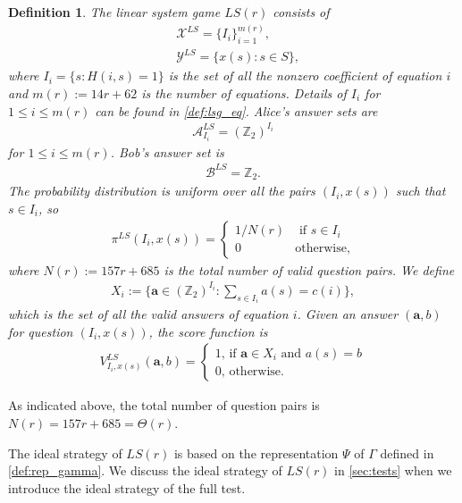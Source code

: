\documentclass[11pt,letterpaper]{article}
\newcommand{\Z}{\mathbb{Z}}
\newcommand{\calX}{\mathcal{X}}
\newcommand{\calY}{\mathcal{Y}}
\newcommand{\calA}{\mathcal{A}}
\newcommand{\calB}{\mathcal{B}}
\newcommand{\1}{\mathbb{1}}
\newcommand{\LS}{LS}
\newcommand{\mr}{m(r)}
\newcommand{\ba}{\pmb{a}}
\newtheorem{definition}[theorem]{Definition}
\theoremstyle{definition}
\begin{document}
\begin{definition}
\label{def:lsg}
The linear system game $\LS(r)$ consists of
\begin{align*}
    & \calX^{\LS} = \{I_i\}_{i=1}^{\mr}, \\
    & \calY^{\LS} = \{ x(s) : s \in S \},
\end{align*}
where $I_i = \{ s : H(i,s) = 1\}$ is the set of all the nonzero coefficient of equation $i$
and $\mr := 14r + 62$ is the number of equations.  
Details of $I_i$ for $1 \leq i \leq \mr$ can be found in \cref{def:lsg_eq}.
Alice's answer sets are 
\begin{align*}
    \calA^{\LS}_{I_i} = (\Z_2)^{I_i}
\end{align*}
for $1 \leq i \leq \mr$.
Bob's answer set is
\begin{align*}
    \calB^{\LS} = \Z_2.
\end{align*}
The probability distribution is uniform over all the pairs $(I_i, x(s))$ such that $s \in I_i$, so
\begin{align*}
    \pi^{\LS}(I_i, x(s)) = 
    \begin{cases}
        1/N(r) & \text{ if } s \in I_i \\
        0 & \text{otherwise,}
    \end{cases}
\end{align*}
where $N(r) := 157r + 685$ is the total number of valid question pairs.
We define 
\begin{align*}
    X_i := \{ \ba \in (\Z_2)^{I_i}: \sum_{s \in I_i} a(s) = c(i) \},
\end{align*}
which is the set of all the valid answers of equation $i$.
Given an answer $(\ba,b)$ for question $(I_i,x(s))$, 
the score function is
\begin{align*}
    V^{\LS}_{I_i, x(s)}(\ba, b) = 
    \begin{cases}
        1 \text{, if } \ba \in X_i \text{ and } a(s) = b\\
        0 \text{, otherwise}.
    \end{cases}
\end{align*}
\end{definition}


As indicated above, the total
number of question pairs is $N(r) = 157r + 685 = \Theta(r)$.

The ideal strategy of $\LS(r)$ is based on
the representation $\Psi$ of $\Gamma$ defined in \cref{def:rep_gamma}.
We discuss the ideal strategy of $\LS(r)$ in \cref{sec:tests}
when we introduce the ideal strategy of the full test.
\end{document}
